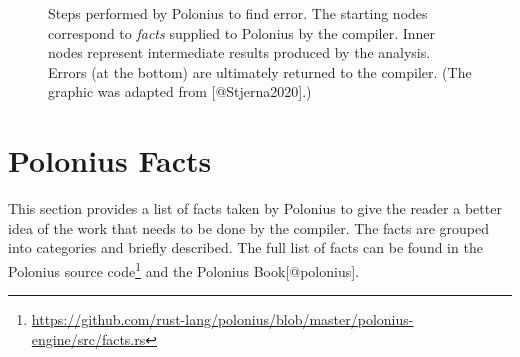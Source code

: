 \documentclass[
  11pt,
]{report}
\DeclareRobustCommand{\href}[2]{#2\footnote{\url{#1}}}
\begin{document}
\begin{figure}
\centering

\caption{Steps performed by Polonius to find error. The starting nodes
correspond to \emph{facts} supplied to Polonius by the compiler. Inner
nodes represent intermediate results produced by the analysis. Errors
(at the bottom) are ultimately returned to the compiler. (The graphic
was adapted from {[}@Stjerna2020{]}.)}
\end{figure}

\section{Polonius Facts}\label{polonius-facts}

This section provides a list of facts taken by Polonius to give the
reader a better idea of the work that needs to be done by the compiler.
The facts are grouped into categories and briefly described. The full
list of facts can be found in the
\href{https://github.com/rust-lang/polonius/blob/master/polonius-engine/src/facts.rs}{Polonius
source code} and the Polonius Book{[}@polonius{]}.
\end{document}
